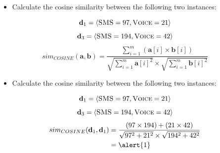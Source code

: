 \documentclass[xcolor={table}]{beamer}
\def\<{\langle}
\def\>{\rangle}
\newcommand{\featN}[1]{\textsc{#1}}
\begin{document}
 \begin{frame} 
 \begin{itemize}
	\item Calculate the cosine similarity between the following two instances:
\end{itemize}
\begin{equation*}
	 \mathbf{d}_{1} = \< \featN{SMS} = 97, \featN{Voice} = 21 \>
\end{equation*}
\begin{equation*}
	 \mathbf{d}_{3} = \< \featN{SMS} = 194,  \featN{Voice} = 42 \>
\end{equation*}
\begin{equation*}
sim_{COSINE}(\mathbf{a}, \mathbf{b}) =  \displaystyle\frac{\sum_{i=1}^m \left(\mathbf{a}[i] \times \mathbf{b}[i]\right) }{\sqrt{\sum_{i=1}^m \mathbf{a}[i]^2} \times \sqrt{\sum_{i=1}^m \mathbf{b}[i]^2}}
\end{equation*}
\end{frame} 

 \begin{frame} 
 \begin{itemize}
	\item Calculate the cosine similarity between the following two instances:
\end{itemize}
\begin{equation*}
	 \mathbf{d}_{1} = \< \featN{SMS} = 97, \featN{Voice} = 21 \>
\end{equation*}
\begin{equation*}
	 \mathbf{d}_{3} = \< \featN{SMS} = 194,  \featN{Voice} = 42 \>
\end{equation*}
\begin{equation*}
	\begin{alignedat}{2}
sim_{COSINE}(\mathbf{d}_{1}, \mathbf{d}_{1}) &= \frac{\left(97 \times 194 \right)+ \left(21 \times 42\right)}{\sqrt{97^2 + 21^2} \times \sqrt{194^2 + 42^2}}\\
&= \alert{1}
	\end{alignedat}
\end{equation*}
\end{frame} 
\end{document}
